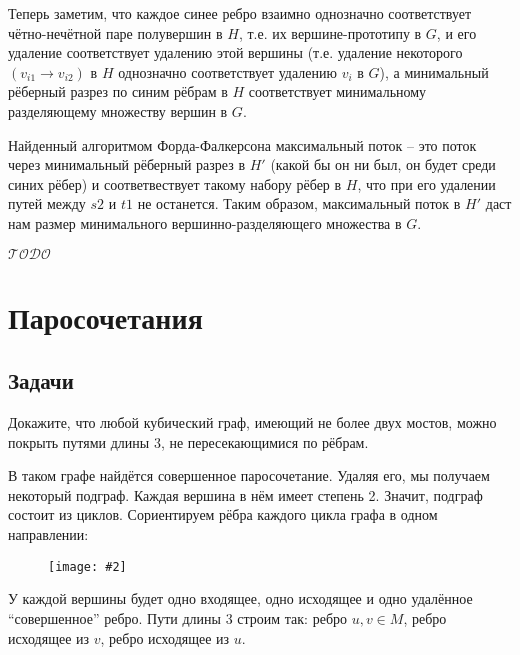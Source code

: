 \documentclass[a4paper,12pt]{article}
\numberwithin{figure}{section}
\def\TODO{\guillemotleft$\mathcal{TODO}$\guillemotright\textellipsis}
\newcommand\CenterFigure[2]{
	\begin{figure}[H]
		\centering
		\texttt{[image: \#2]}
	\end{figure}
}
\begin{document}
\begin{solution}
	Теперь заметим, что каждое синее ребро взаимно однозначно соответствует чётно-нечётной паре полувершин в $H$, т.е. их вершине-прототипу в $G$, и его удаление соответствует удалению этой вершины (т.е. удаление некоторого $(v_{i1} \rightarrow v_{i2})$ в $H$ однозначно соответствует удалению $v_i$ в $G$), а минимальный рёберный разрез по синим рёбрам в $H$ соответствует минимальному разделяющему множеству вершин в $G$.
	
	Найденный алгоритмом Форда-Фалкерсона максимальный поток -- это поток через минимальный рёберный разрез в $H'$ (какой бы он ни был, он будет среди синих рёбер) и соответвествует такому набору рёбер в $H$, что при его удалении путей между $s2$ и $t1$ не останется. Таким образом, максимальный поток в $H'$ даст нам размер минимального вершинно-разделяющего множества в $G$.
\end{solution}

\TODO



\section{Паросочетания}

\subsection{Задачи}

\begin{problem}
	Докажите, что любой кубический граф, имеющий не более двух мостов, можно покрыть путями длины 3, не пересекающимися по рёбрам.
\end{problem}
\begin{solution}
	В таком графе найдётся совершенное паросочетание. Удаляя его, мы получаем некоторый подграф. Каждая вершина в нём имеет степень 2. Значит, подграф состоит из циклов. Сориентируем рёбра каждого цикла графа в одном направлении:
		\CenterFigure{10cm}{cubic-graph-cover-paths-3.png}
	У каждой вершины будет одно входящее, одно исходящее и одно удалённое ``совершенное'' ребро. Пути длины 3 строим так: ребро ${u,v} \in M$, ребро исходящее из $v$, ребро исходящее из $u$.
\end{solution}
\end{document}
